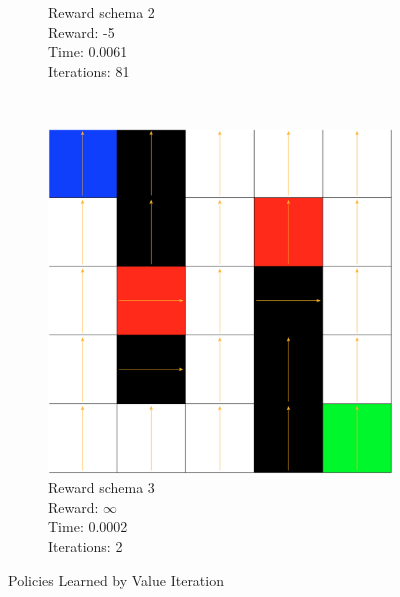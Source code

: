 \documentclass[a4paper,10pt]{article}
\begin{document}
\begin{figure}[h!]
\begin{subfigure}[b]{0.3\textwidth}
                \caption{Reward schema 2\\
                Reward: -5 \\
                Time:  0.0061\\
                Iterations: 81}
                \label{fig:tiger}
        \end{subfigure}
        ~ %
        \begin{subfigure}[b]{0.3\textwidth}
                \includegraphics[width=\textwidth]{figures/5x5_viter_r3.png}
                \caption{Reward schema 3\\
                Reward: $\infty$  \\
                Time:  0.0002\\
                Iterations: 2}
                \label{fig:mouse}
        \end{subfigure}
        \caption{Policies Learned by Value Iteration}\label{fig:animals}
\end{figure}
\end{document}
